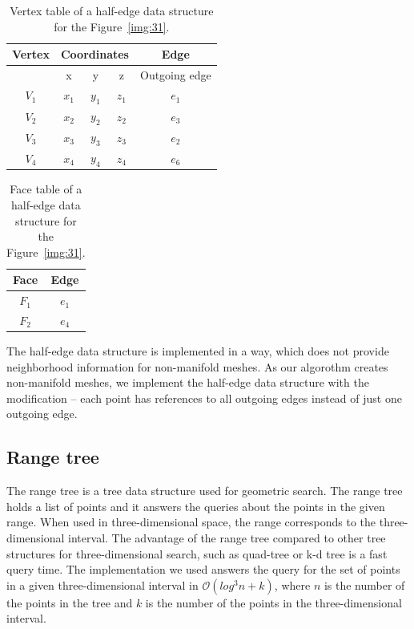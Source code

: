 \begin{table}[]
    \centering
    \begin{tabular}{|c|ccc|c|}
    \hline
    \hline
    Vertex  & \multicolumn{3}{c|}{Coordinates}          & Edge            \\ \hline
          & x            & y            & z           & Outgoing edge   \\ \hline\hline
    $V_1$ & $x_1$        & $y_1$        & $z_1$       & $e_1$           \\ \hline
    $V_2$ & $x_2$        & $y_2$        & $z_2$       & $e_3$           \\ \hline
    $V_3$ & $x_3$        & $y_3$        & $z_3$       & $e_2$           \\ \hline
    $V_4$ & $x_4$        & $y_4$        & $z_4$       & $e_6$           \\ \hline\hline
    \end{tabular}
\caption{Vertex table of a half-edge data structure for the Figure~\ref{img:31}.}
\label{tab:6}
\end{table}

\begin{table}[]
    \centering
    \begin{tabular}{|c|c|}
    \hline
    \hline
    Face  & Edge            \\ \hline\hline
    $F_1$ & $e_1$           \\ \hline
    $F_2$ & $e_4$           \\ \hline\hline
    \end{tabular}
\caption{Face table of a half-edge data structure for the Figure~\ref{img:31}.}
\label{tab:7}
\end{table}

The half-edge data structure is implemented in a way, which does not provide 
neighborhood information for non-manifold meshes.
As our algorothm creates non-manifold meshes, we implement the half-edge data
structure with the modification -- each point has references to all outgoing edges
instead of just one outgoing edge. 

\subsection{Range tree}
The range tree is a tree data structure used for geometric search.
The range tree holds a list of points and it answers the queries about
the points in the given range. When used in three-dimensional space, 
the range corresponds to the three-dimensional interval.
The advantage of the range tree compared to other tree structures for 
three-dimensional search, such as quad-tree or k-d tree is a fast query
time. The implementation we used \cite{rangetree} answers the query for 
the set of points in a given three-dimensional
interval in $\mathcal{O}(log^3n+k)$, where $n$ is the number of
the points in the tree and $k$ is the number of the points in the three-dimensional
interval.


